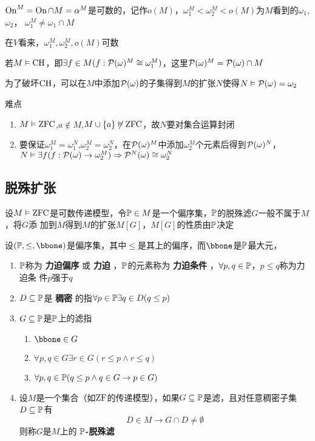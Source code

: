 \documentclass[11pt]{article}
\begin{document}
\(\On^M=\On\cap M=\alpha^M\)是可数的，记作\(o(M)\)，\(\omega_1^M<\omega_2^M<o(M)\)为\(M\)看到的\(\omega_1\), \(\omega_2\)，
\(\omega^M_1\neq\omega_1\cap M\)

在\(V\)看来，\(\omega_1^M,\omega_2^M,o(M)\)可数

若\(M\vDash\CH\)，即\(\exists f\in M(f:\calp(\omega)^M\cong\omega_1^M)\)，这里\(\calp(\omega)^M=\calp(\omega)\cap M\)

为了破坏\(\CH\)，可以在\(M\)中添加\(\calp(\omega)\)的子集得到\(M\)的扩张\(N\)使得\(N\vDash\calp(\omega)=\omega_2\)


难点
\begin{enumerate}
\item \(M\vDash\ZFC\),\(a\notin M\),\(M\cup\{a\}\not\vDash\ZFC\)，故\(N\)要对集合运算封闭
\item 要保证\(\omega_1^M=\omega_1^N\),\(\omega_2^M=\omega_2^N\)，在\(\calp(\omega)^M\)中添加\(\omega_2^M\)个元素后得到\(\calp(\omega)^N\)，
\(N\vDash\exists f(f:\calp(\omega)\to\omega_2^M)\Rightarrow\calp^N(\omega)\cong\omega_2^N\)
\end{enumerate}
\subsection{脱殊扩张}
\label{sec:org3e9b86c}
设\(M\vDash\ZFC\)是可数传递模型，令\(\P\in M\)是一个偏序集，\(\P\)的脱殊滤\(G\)一般不属于\(M\)，将\(G\)添
加到\(M\)得到\(M\)的扩张\(M[G]\)，\(M[G]\)的性质由\(\P\)决定

\begin{definition}[]
设\((\P,\le,\bbone)\)是偏序集，其中\(\le\)是其上的偏序，而\(\bbone\)是\(\P\)最大元，
\begin{enumerate}
\item \(\P\)称为 \textbf{力迫偏序} 或 \textbf{力迫} ，\(\P\)的元素称为 \textbf{力迫条件} ，\(\forall p,q\in\P\)，\(p\le q\)称为力迫条
件\(p\)强于\(q\)
\item \(D\subseteq\P\)是 \textbf{稠密} 的指\(\forall p\in\P\exists q\in D(q\le p)\)
\item \(G\subseteq\P\)是\(\P\)上的滤指
\begin{enumerate}
\item \(\bbone\in G\)
\item \(\forall p,q\in G\exists r\in G(r\le p\wedge r\le q)\)
\item \(\forall p,q\in\P(q\le p\wedge q\in G\to p\in G)\)
\end{enumerate}
\item 设\(M\)是一个集合（如\(\ZF\)的传递模型），如果\(G\subseteq\P\)是滤，且对任意稠密子集\(D\subseteq\P\)有
\begin{equation*}
D\in M\to G\cap D\neq\emptyset
\end{equation*}
则称\(G\)是\(M\)上的 \textbf{\(\P\)-脱殊滤}
\end{enumerate}
\end{definition}
\end{document}
